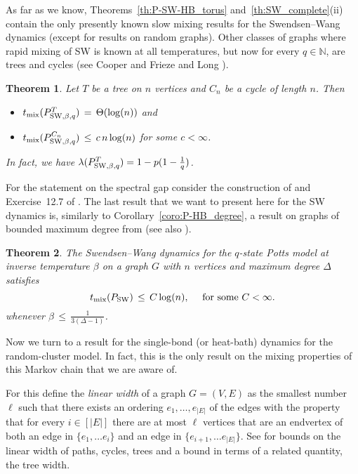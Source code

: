 \documentclass{dis}
\newtheorem{theorem}{Theorem}[chapter]
\theoremstyle{citing}
\begin{document}
As far as we know, Theorems~\ref{th:P-SW-HB_torus} and~\ref{th:SW_complete}(ii) 
contain the only presently known 
slow mixing results for the Swendsen--Wang dynamics 
(except for results on random graphs). 
Other classes of graphs where rapid mixing of SW is known at 
all temperatures, but now for every $q\in{\ensuremath{\mathbb{N}}}$, are 
trees and cycles (see Cooper and Frieze \cite{CF} and 
Long \cite{Long}).

\begin{theorem} \label{th:SW_tree-cycle}
Let $T$ be a tree on $n$ vertices and $C_n$ be a cycle of length $n$.
Then
\begin{itemize}
	\item $t_{\rm mix}(P_{{\rm SW},\beta,q}^T) \,=\, \Theta(\log(n))$ 
					\; and \vspace{2mm}
	\item $t_{\rm mix}(P_{{\rm SW},\beta,q}^{C_n})\,\le\,c\, n\log(n)$ 
					\quad for some $c<\infty$. \vspace{1mm}
\end{itemize}
In fact, we have 
$\lambda(P_{{\rm SW},\beta,q}^T)=1-p(1-\frac1q)$.
\end{theorem}

For the statement on the spectral gap consider the construction of 
\cite[Chap.~7]{Long} and Exercise~12.7 of \cite{LPW}.
The last result that we want to present here for the SW dynamics is, 
similarly to Corollary~\ref{coro:P-HB_degree}, a result on 
graphs of bounded maximum degree from \cite{Hu} (see also \cite{CF}).

\begin{theorem}\label{known-th:SW_degree}
The Swendsen--Wang dynamics for the $q$-state Potts model  
at inverse temperature $\beta$ on a graph $G$ with $n$ vertices 
and maximum degree ${\Delta}$ satisfies
\[
t_{\rm mix}({P_{\rm SW}}) \,\le\, C \log(n), \quad \text{ for some } C<\infty.
\]
whenever $\beta\,\le\,\frac{1}{3({\Delta}-1)}$.
\end{theorem}

Now we turn to a result for the single-bond (or heat-bath) 
dynamics for the random-cluster model. 
In fact, this is the only result on the mixing 
properties of this Markov chain that we are aware of.

For this define the 
\emph{linear width} 
of a graph $G=(V,E)$ as the 
smallest number $\ell$ such that there exists an ordering 
$e_1,\dots,e_{{\left\vert {E} \right\vert}}$ of the edges with the property that for 
every $i\in[{\left\vert {E} \right\vert}]$ there are at most $\ell$ vertices that are 
an endvertex of both an edge in $\{e_1,\dots e_i\}$ and an edge in 
$\{e_{i+1},\dots e_{{\left\vert {E} \right\vert}}\}$. See \cite{GeS} for bounds on the 
linear width of paths, cycles, trees and a bound in terms of a 
related quantity, the tree width.
\end{document}
